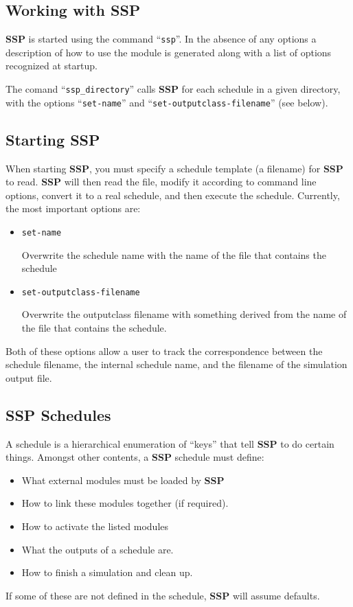 \documentclass[12pt]{article}
\begin{document}
\subsection*{Working with SSP}

{\bf SSP} is started using the command ``{\tt ssp}''. In the absence of any options a description of how to use the module is generated along with a list of options recognized at startup.

The comand ``{\tt ssp\_directory}'' calls {\bf SSP} for each schedule in a given directory, with the options ``{\tt set-name}'' and ``{\tt set-outputclass-filename}'' (see below).

\subsection*{Starting {\bf SSP}}

When starting {\bf SSP}, you must specify a schedule template (a filename) for {\bf SSP} to read. {\bf SSP} will then read the file, modify it according to command line options, convert it to a real schedule, and then execute the schedule. Currently, the most important options are:
\begin{itemize}
\item[ ]{\tt set-name}

Overwrite the schedule name with the name of the file that contains the schedule
\item[ ]{\tt set-outputclass-filename}

Overwrite the outputclass filename with something derived from the name of the file that contains the schedule.
\end{itemize}
Both of these options allow a user to track the correspondence between the schedule filename, the internal schedule name, and the filename of the simulation output file.

\subsection*{SSP Schedules}

A schedule is a hierarchical enumeration of ``keys'' that tell {\bf SSP} to do certain things. Amongst other contents, a {\bf SSP} schedule must define:
\begin{itemize}
\item What external modules must be loaded by {\bf SSP}
\item How to link these modules together (if required).
\item How to activate the listed modules
\item What the outputs of a schedule are.
\item How to finish a simulation and clean up.
\end{itemize}
If some of these are not defined in the schedule, {\bf SSP} will assume defaults.
\end{document}
